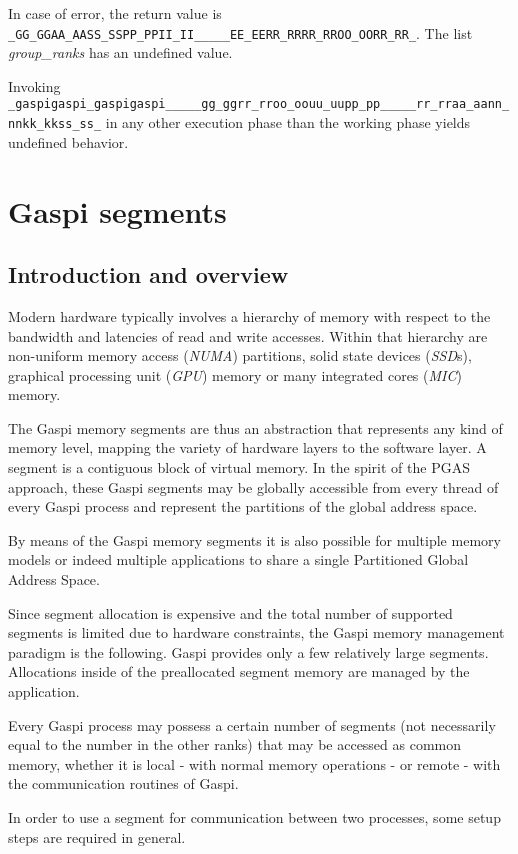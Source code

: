 \documentclass{article}
\makeatletter
\newlength{\st}\setlength{\st}{0pt}
\newcommand{\zerowsep}{\hskip 0pt plus 0.1pt minus 0.1pt}
\newcommand{\ZSEP}[1]{\ifx#1\@@@EOZ@@@\let\next\relax\else\ifx#1\_#1\zerowsep\else#1\fi\let\next\ZSEP\fi\next}
\newcommand{\zsep}[1]{\ZSEP{}#1\@@@EOZ@@@}
\newcommand{\gaspiprefix}{gaspi}
\newcommand{\GASPI}{{\sc Gaspi}}
\newcommand{\function}[1]{{\tt #1}}
\newcommand{\parameter}[1]{{\it #1}}
\newcommand{\gaspifunction}[1]{\function{\protect\zsep{\gaspiprefix\_#1}}}
\newcommand{\GASPIGERR}{{\tt\protect\zsep{GASPI\_ERROR}}}
\makeatother
\begin{document}
In case of error, the return value is \GASPIGERR{}. The list
\parameter{group\_ranks} has an undefined value.

Invoking
\gaspifunction{group\_ranks} in any other execution phase than the working phase
yields undefined behavior.


\section{\GASPI{} segments}

\subsection{Introduction and overview}

Modern hardware typically involves a hierarchy of memory with respect to the
bandwidth and latencies of read and write accesses. Within that hierarchy are
non-uniform memory access (\emph{NUMA}) partitions, solid state
devices (\emph{SSD}s), graphical processing unit (\emph{GPU}) memory
or many integrated cores (\emph{MIC}) memory.

The \GASPI{} memory segments are thus an abstraction that represents
any kind of memory level, mapping the variety of hardware layers to the
software layer. A segment is a contiguous block of virtual memory.
In the spirit of the PGAS approach, these \GASPI{}
segments may be globally accessible from every thread of every \GASPI{}
process and represent the partitions of the global address space.

By means of the \GASPI{} memory segments it is also possible for multiple 
memory models or indeed multiple applications to share a single Partitioned Global
Address Space.

Since segment allocation is expensive and the total number of supported
segments is limited due to hardware constraints, the \GASPI{} memory
management paradigm is the following.
\GASPI{} provides only a few relatively large segments.
Allocations inside of the preallocated segment memory are managed
by the application.

Every \GASPI{} process may possess a certain number of segments (not necessarily equal to the number in the other ranks) that may be accessed as common memory,
whether it is local - with normal memory operations - or remote - with
the communication routines of \GASPI{}.

In order to use a segment for communication between two processes,
some setup steps are required in general.
\end{document}
